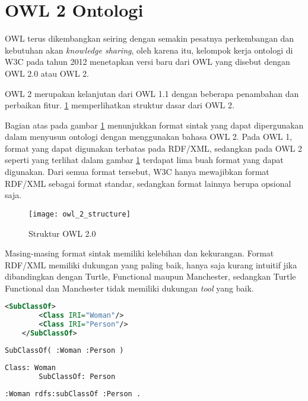 \section{OWL 2 Ontologi}
OWL terus dikembangkan seiring dengan semakin pesatnya perkembangan dan kebutuhan akan \emph{knowledge sharing}, oleh karena itu, kelompok kerja ontologi di W3C pada tahun 2012 menetapkan versi baru dari OWL yang disebut dengan OWL 2.0 atau OWL 2.

OWL 2 merupakan kelanjutan dari OWL 1.1 dengan beberapa penambahan dan perbaikan fitur. \ref{fig:owl_2_structure} memperlihatkan struktur dasar dari OWL 2.

Bagian atas pada gambar \ref{fig:owl_2_structure} menunjukkan format sintak yang dapat dipergunakan dalam menyusun ontologi dengan menggunakan bahasa OWL 2. Pada OWL 1, format yang dapat digunakan terbatas pada RDF/XML, sedangkan pada OWL 2 seperti yang terlihat dalam gambar \ref{fig:owl_2_structure} terdapat lima buah format yang dapat digunakan. Dari semua format tersebut, W3C hanya mewajibkan format RDF/XML sebagai format standar, sedangkan format lainnya berupa opsional saja.

\begin{figure}[ht]
	\centering
	\texttt{[image: owl\_2\_structure]}
	\caption{Struktur OWL 2.0}
	\label{fig:owl_2_structure}
\end{figure}

Masing-masing format sintak memiliki kelebihan dan kekurangan. Format RDF/XML memiliki dukungan yang paling baik, hanya saja kurang intuitif jika dibandingkan dengan Turtle, Functional maupun Manchester, sedangkan Turtle Functional dan Manchester tidak memiliki dukungan \emph{tool} yang baik.

\begin{lstlisting}[language=XML, caption=contoh sintak RDF/XML]
	<SubClassOf>
		<Class IRI="Woman"/>
		<Class IRI="Person"/>
	</SubClassOf>
\end{lstlisting}

\begin{lstlisting}[language=XML, caption=contoh sintak functional]
	SubClassOf( :Woman :Person )
\end{lstlisting}
	
\begin{lstlisting}[language=XML, caption=contoh manchester syntax]
	Class: Woman
		SubClassOf: Person
\end{lstlisting}

\begin{lstlisting}[language=XML, caption=contoh sintak turtle]
	:Woman rdfs:subClassOf :Person .
\end{lstlisting}

